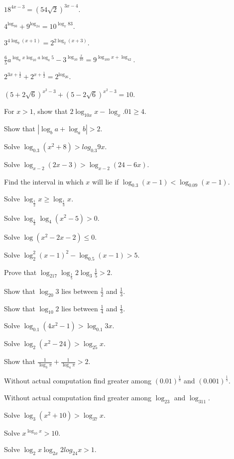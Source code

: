 \item $18^{4x - 3} = (54\sqrt{2})^{3x - 4}$.
\item $4^{\log_93} + 9^{\log_24} = 10^{\log_x83}$.
\item $3^{4\log_9(x + 1)} = 2^{2\log_2(x + 3)}$.
\item $\frac{6}{5}a^{\log_ax\log_{10}a\log_a5} - 3^{\log_{10}\frac{x}{10}} = 9^{\log_{100}x + \log_42}$.
\item $2^{3x + \frac{1}{2}} + 2^{x + \frac{1}{2}} = 2^{\log_26}$.
\item $(5 + 2\sqrt{6})^{x^2 - 3} + (5 - 2\sqrt{6})^{x^2 - 3} = 10$.
\item For $x> 1$, show that $2\log_{10x}x - \log_x{.01}\geq 4$.
\item Show that $|\log_b a + \log_ab| > 2$.
\item Solve $\log_{0.3}(x^2 + 8) > log_{0.3}9x$.
\item Solve $\log_{x - 2}(2x - 3) > \log_{x - 2}(24 - 6x)$.
\item Find the interval in which $x$ will lie if $\log_{0.3}(x - 1) < \log_{0.09}(x - 1)$.
\item Solve $\log_{\frac{1}{2}}x \geq \log_{\frac{1}{3}}x$.
\item Solve $\log_{\frac{1}{3}}\log_4(x^2 - 5) > 0$.
\item Solve $\log(x^2 -2x -2)\leq 0$.
\item Solve $\log_2^2(x-1)^2 - \log_{0.5}(x - 1) > 5$.
\item Prove that $\log_217\log_{\frac{1}{5}}2\log_3\frac{1}{5} > 2$.
\item Show that $\log_{20}3$ lies between $\frac{1}{2}$ and $\frac{1}{3}$.
\item Show that $\log_{10}2$ lies between $\frac{1}{4}$ and $\frac{1}{3}$.
\item Solve $\log_{0.1}(4x^2 - 1) > \log_{0.1}3x$.
\item Solve $\log_2(x^2 - 24) > \log_25x$.
\item Show that $\frac{1}{\log_3\pi} + \frac{1}{\log_4\pi} > 2$.
\item Without actual computation find greater among $(0.01)^{\frac{1}{3}}$ and $(0.001)^{\frac{1}{5}}$.
\item Without actual computation find greater among $\log_23$ and $\log_311$.
\item Solve $\log_3(x^2 + 10) > \log_37x$.
\item Solve $x^{\log_{10}x} > 10$.
\item Solve $\log_2x\log_{2x}2log_24x > 1$.

